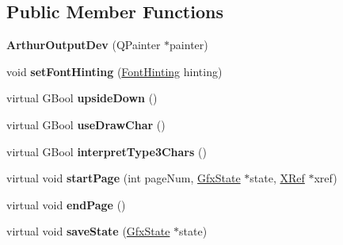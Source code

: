 \subsection*{Public Member Functions}
\begin{DoxyCompactItemize}
\item 
\mbox{\label{class_arthur_output_dev_a47fbf79b876a4e51f921c59c643b87b0}} 
{\bfseries Arthur\+Output\+Dev} (Q\+Painter $\ast$painter)
\item 
\mbox{\label{class_arthur_output_dev_a147b2711671a1da4daff6e3a98a4bc23}} 
void {\bfseries set\+Font\+Hinting} (\hyperlink{class_arthur_output_dev_adf1c06826670a14bb7199333c90c1a3b}{Font\+Hinting} hinting)
\item 
\mbox{\label{class_arthur_output_dev_a53c547cc0e63cd518ba5b5e19ecab5b2}} 
virtual G\+Bool {\bfseries upside\+Down} ()
\item 
\mbox{\label{class_arthur_output_dev_a7c660aeb893e44e05ad7895c14ef089f}} 
virtual G\+Bool {\bfseries use\+Draw\+Char} ()
\item 
\mbox{\label{class_arthur_output_dev_a70282b634a31d3be6377127d652f3384}} 
virtual G\+Bool {\bfseries interpret\+Type3\+Chars} ()
\item 
\mbox{\label{class_arthur_output_dev_a1ef451fefd441163263b7523c20d2377}} 
virtual void {\bfseries start\+Page} (int page\+Num, \hyperlink{class_gfx_state}{Gfx\+State} $\ast$state, \hyperlink{class_x_ref}{X\+Ref} $\ast$xref)
\item 
\mbox{\label{class_arthur_output_dev_a22a55debb433f8eca1746799226c8c25}} 
virtual void {\bfseries end\+Page} ()
\item 
\mbox{\label{class_arthur_output_dev_ab69e7d5f3c7ef02aa8fbe3bb2448c2f7}} 
virtual void {\bfseries save\+State} (\hyperlink{class_gfx_state}{Gfx\+State} $\ast$state)
\item 
\mbox{\label{class_arthur_output_dev_a66912b0283246112c74798e49b973f88}} 

\end{DoxyCompactItemize}
